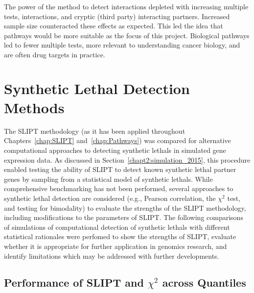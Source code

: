 The power of the method to detect interactions depleted with increasing multiple tests, interactions, and cryptic (third party) interacting partners. Increased sample size counteracted these effects as expected. This led the idea that pathways would be more suitable as the focus of this project. Biological pathways led to fewer multiple tests, more relevant to understanding cancer biology, and are often drug targets in practice.
\fi

\section{Synthetic Lethal Detection Methods} \label{chapt5:compare_methods}

The \gls{SLIPT} methodology (as it has been applied throughout Chapters~\ref{chap:SLIPT} and~\ref{chap:Pathways}) was compared for alternative computational approaches to detecting \glspl{synthetic lethal} in simulated \gls{gene expression} data. As discussed in Section~\ref{chapt2:simulation_2015}, this procedure enabled testing the ability of \gls{SLIPT} to detect known \gls{synthetic lethal} partner genes by sampling from a statistical model of \glspl{synthetic lethal}. While comprehensive benchmarking has not been performed, several approaches to \gls{synthetic lethal} detection are considered (e.g., Pearson correlation, the $\chi^2$ test, and testing for bimodality) to evaluate the strengths of the \gls{SLIPT} methodology, including modifications to the parameters of \gls{SLIPT}.
%
The following comparisons of simulations of computational detection of \glspl{synthetic lethal} with different statistical rationales were perfomed to show the strengths of \gls{SLIPT}, evaluate whether it is appropriate for further application in \glspl{genomic} research, and identify limitations which may be addressed with further developments. %

\subsection{Performance of SLIPT and $\chi^2$ across Quantiles}
\label{chapt5:compare_chisq}

